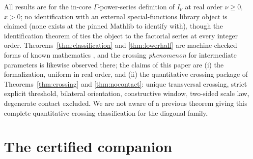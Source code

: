 \documentclass[11pt]{article}
\begin{document}
All results are for the in-core $\Gamma$-power-series definition of
$I_\nu$ at real order $\nu \ge 0$, $x > 0$; no identification with
an external special-functions library object is claimed (none
exists at the pinned Mathlib to identify with), though the
identification theorem of \cite{ErikssonC4} ties the object to the
factorial series at every integer order.
Theorems~\ref{thm:classification} and \ref{thm:lowerhalf} are
machine-checked forms of known mathematics \cite{RS16}, and the
crossing \emph{phenomenon} for intermediate parameters is likewise
observed there; the claims of this paper are (i) the
formalization, uniform in real order, and (ii) the quantitative
crossing package of Theorems~\ref{thm:crossing} and
\ref{thm:nocontact}: unique transversal crossing, strict explicit
threshold, bilateral orientation, constructive window, two-sided
scale law, degenerate contact excluded.  We are not aware of a
previous theorem giving this complete quantitative crossing
classification for the diagonal family.

\section{The certified companion}\label{sec:companion}
\end{document}
